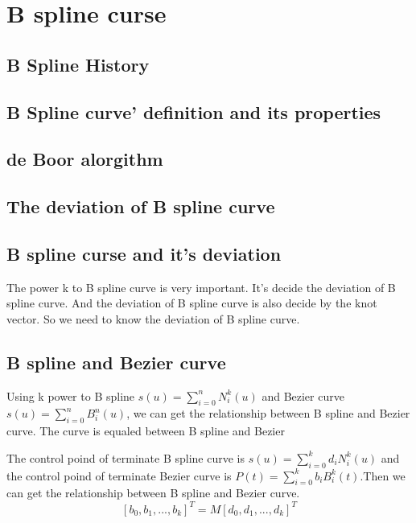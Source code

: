 \chapter{B spline curse}

\section{B Spline History}

\section{B Spline curve' definition and its properties}

\section{de Boor alorgithm}



\section{The deviation of B spline curve}

\section{B spline curse and it's deviation}

The power k to B spline curve is very important. It's decide the deviation of B spline curve. And the deviation of B spline curve is also decide by the knot vector. So we need to know the deviation of B spline curve.\\

\section{B spline and Bezier curve}

Using k power to B spline $s(u)=\sum\limits_{i=0}^{n} N_{i}^{k}(u)$ and Bezier curve $s(u)=\sum\limits_{i=0}^{n} B_{i}^{n}(u)$, we can get the relationship between B spline and Bezier curve. The curve is equaled between B spline and Bezier \\

\begin{definition}[]
	The control poind of terminate B spline curve is $s(u) = \sum_{i=0}^{k}d_i N_{i}^{k}(u)$ and the control poind of terminate Bezier curve is $P(t) = \sum\limits_{i=0}^{k}b_i B_{i}^{k}(t) $.Then we can get the relationship between B spline and Bezier curve.\[
		[b_0,b_1,...,b_k]^T = M[d_0,d_1,...,d_k]^T
	\]
\end{definition}



